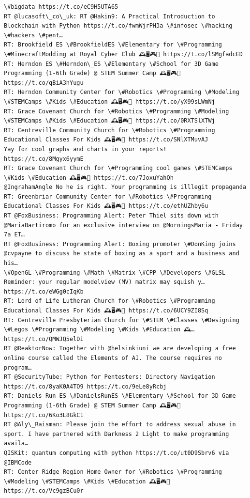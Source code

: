 \documentclass[11pt]{article}
\begin{document}
\begin{Verbatim}[commandchars=\\\{\}]
\#bigdata https://t.co/eC9H5UTA65
RT @lucasoft\_co\_uk: RT @Hakin9: A Practical Introduction to Blockchain with Python https://t.co/fwmWjrPH3a \#infosec \#hacking \#hackers \#pent…
RT: Brookfield ES \#BrookfieldES \#Elementary for \#Programming \#MinecraftModding at Royal Cyber Club 🕰️🖥️🎮💎 https://t.co/lSMgfadcED
RT: Herndon ES \#Herndon\_ES \#Elementary \#School for 3D Game Programming (1-6th Grade) @ STEM Summer Camp 🕰️🖥️🎮💎 https://t.co/qBiA3hYugu
RT: Herndon Community Center for \#Robotics \#Programming \#Modeling \#STEMCamps \#Kids \#Education 🕰️🖥️🎮💎 https://t.co/yX99sLWmNj
RT: Grace Covenant Church for \#Robotics \#Programming \#Modeling \#STEMCamps \#Kids \#Education 🕰️🖥️🎮💎 https://t.co/0RXTSlXTWj
RT: Centreville Community Church for \#Robotics \#Programming Educational Classes For Kids 🕰️🖥️🎮💎 https://t.co/SNlXTMuvAJ
Yay for cool graphs and charts in your reports! https://t.co/8Mgyx6yymE
RT: Grace Covenant Church for \#Programming cool games \#STEMCamps \#Kids \#Education 🕰️🖥️🎮💎 https://t.co/7JoxuYahQh
@IngrahamAngle No he is right. Your programming is illlegit propaganda
RT: Greenbriar Community Center for \#Robotics \#Programming Educational Classes For Kids 🕰️🖥️🎮💎 https://t.co/ethUZhby6u
RT @FoxBusiness: Programming Alert: Peter Thiel sits down with @MariaBartiromo for an exclusive interview on @MorningsMaria - Friday 7a ET…
RT @FoxBusiness: Programming Alert: Boxing promoter \#DonKing joins @cvpayne to discuss he state of boxing as a sport and a business and his…
\#OpenGL \#Programming \#Math \#Matrix \#CPP \#Developers \#GLSL Reminder: your regular modelview (MV) matrix may squish y… https://t.co/eWGg0cIqKb
RT: Lord of Life Lutheran Church for \#Robotics \#Programming Educational Classes For Kids 🕰️🖥️🎮💎 https://t.co/6UCY9ZI8Sq
RT: Centreville Presbyterian Church for \#STEM \#Classes \#Designing \#Legos \#Programming \#Modeling \#Kids \#Education 🕰️… https://t.co/QMWJQ5elDi
RT @ReaktorNow: Together with @helsinkiuni we are developing a free online course called the Elements of AI. The course requires no program…
RT @SecurityTube: Python for Pentesters: Directory Navigation https://t.co/8yaK0A4TO9 https://t.co/9eLe8yRcbj
RT: Daniels Run ES \#DanielsRunES \#Elementary \#School for 3D Game Programming (1-6th Grade) @ STEM Summer Camp 🕰️🖥️🎮💎 https://t.co/6Ko3L8GkC1
RT @Aly\_Raisman: Please join the effort to address sexual abuse in sport. I have partnered with Darkness 2 Light to make programming availa…
QISKit: quantum computing with python https://t.co/ut0D9Sbrv6 via @IBMCode
RT: Center Ridge Region Home Owner for \#Robotics \#Programming \#Modeling \#STEMCamps \#Kids \#Education 🕰️🖥️🎮💎 https://t.co/Vc9gzBCu0r

\end{Verbatim}
\end{document}
